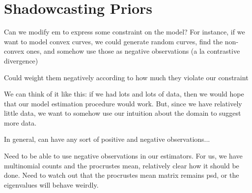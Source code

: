 
\section{Shadowcasting Priors}

Can we modify em to express some constraint on the model? For
instance, if we want to model convex curves, we could generate random
curves, find the non-convex ones, and somehow use those as negative
observations (a la contrastive divergence)

Could weight them negatively according to how much they violate our
constraint

We can think of it like this: if we had lots and lots of data, then we
would hope that our model estimation procedure would work. But, since
we have relatively little data, we want to somehow use our intuition
about the domain to suggest more data.

In general, can have any sort of positive and negative observations...

Need to be able to use negative observations in our estimators. For
us, we have multinomial counts and the procrustes mean, relatively
clear how it should be done. Need to watch out that the procrustes
mean matrix remains psd, or the eigenvalues will behave weirdly.

